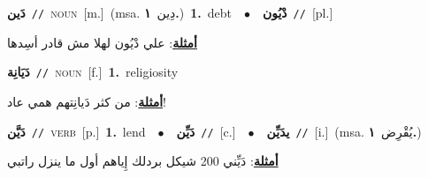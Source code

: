 \documentclass[10pt,a4paper,twoside]{article} %
\begin{document}
\begin{multicols}{2}
{\setlength\topsep{0pt}\textbf{\foreignlanguage{arabic}{دَين}}\ {\color{gray}\texttt{//}\color{black}}\ \textsc{noun}\ [m.]\ \color{gray}(msa. \foreignlanguage{arabic}{دِين}~\foreignlanguage{arabic}{\textbf{١.}})\color{black}\ \textbf{1.}~debt\ \ $\bullet$\ \ \setlength\topsep{0pt}\textbf{\foreignlanguage{arabic}{دْيُون}}\ {\color{gray}\texttt{//}\color{black}}\ [pl.]\  \begin{flushright}\color{gray}\foreignlanguage{arabic}{\textbf{\underline{\foreignlanguage{arabic}{أمثلة}}}: علي دْيُون لهلا مش قادر أسِدها}\end{flushright}\color{black}} \vspace{2mm}

{\setlength\topsep{0pt}\textbf{\foreignlanguage{arabic}{دَيَانِة}}\ {\color{gray}\texttt{//}\color{black}}\ \textsc{noun}\ [f.]\ \textbf{1.}~religiosity\  \begin{flushright}\color{gray}\foreignlanguage{arabic}{\textbf{\underline{\foreignlanguage{arabic}{أمثلة}}}: من كثر دَيانِتهم همي عاد!}\end{flushright}\color{black}} \vspace{2mm}

{\setlength\topsep{0pt}\textbf{\foreignlanguage{arabic}{دَيَّن}}\ {\color{gray}\texttt{//}\color{black}}\ \textsc{verb}\ [p.]\ \textbf{1.}~lend\ \ $\bullet$\ \ \setlength\topsep{0pt}\textbf{\foreignlanguage{arabic}{دَيِّن}}\ {\color{gray}\texttt{//}\color{black}}\ [c.]\ \ $\bullet$\ \ \setlength\topsep{0pt}\textbf{\foreignlanguage{arabic}{يدَيِّن}}\ {\color{gray}\texttt{//}\color{black}}\ [i.]\ \color{gray}(msa. \foreignlanguage{arabic}{يُقْرِض}~\foreignlanguage{arabic}{\textbf{١.}})\color{black}\  \begin{flushright}\color{gray}\foreignlanguage{arabic}{\textbf{\underline{\foreignlanguage{arabic}{أمثلة}}}: دَيِّني 200 شيكل بردلك إِياهم أول ما ينزل راتبي}\end{flushright}\color{black}} \vspace{2mm}


\end{multicols}
\end{document}
